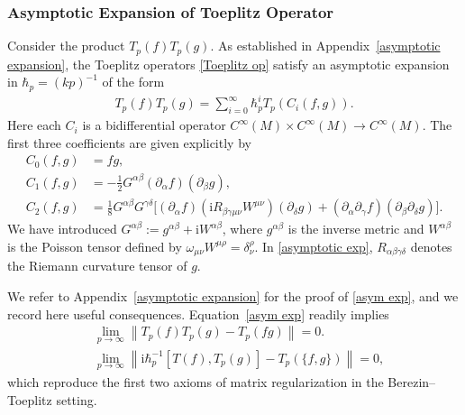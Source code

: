 \documentclass[12pt]{article}
\newcommand{\im}{\mathrm{i}}
\theoremstyle{definition} %
\theoremstyle{plain} %
\theoremstyle{remark} %
\theoremstyle{underline}
\begin{document}
\subsubsection{Asymptotic Expansion of Toeplitz Operator}

Consider the product \(T_p(f)T_p(g)\).
As established in Appendix~\ref{asymptotic expansion}, the Toeplitz operators \eqref{Toeplitz op} satisfy an asymptotic expansion in
\(\hbar_p=(kp)^{-1}\) of the form
\begin{align}
     T_p(f) T_p(g) = \sum_{i=0}^{\infty} \hbar_{p}^i T_p(C_i(f,g)).
    \label{asym exp}
\end{align}
Here each \(C_i\) is a bidifferential operator \(C^\infty(M)\times C^\infty(M)\to C^\infty(M)\).
The first three coefficients are given explicitly by
\begin{align}
    C_0(f,g) &= fg,\\
    C_1(f,g) &= -\frac{1}{2} G^{\alpha\beta}(\partial_{\alpha}f)(\partial_{\beta}g),\\
    C_2(f,g) &= \frac{1}{8} G^{\alpha\beta}G^{\gamma\delta}
    \bigl[(\partial_{\alpha} f)
    ( \im R_{\beta \gamma \mu \nu} W^{\mu\nu} )
    (\partial_{\delta}g)
    + (\partial_{\alpha} \partial_{\gamma} f)
    (\partial_{\beta} \partial_{\delta} g)\bigr].
    \label{asymptotic exp}
\end{align}
We have introduced
\(G^{\alpha\beta}:=g^{\alpha\beta}+\im W^{\alpha\beta}\), where \(g^{\alpha\beta}\)
is the inverse metric and \(W^{\alpha\beta}\) is the Poisson tensor defined by
\(\omega_{\mu\nu}W^{\mu\rho}=\delta_\nu^\rho\).
In \eqref{asymptotic exp}, \(R_{\alpha\beta\gamma\delta}\) denotes the Riemann curvature tensor of \(g\).

We refer to Appendix~\ref{asymptotic expansion} for the proof of
\eqref{asym exp}, and we record here useful consequences.
Equation~\eqref{asym exp} readily implies
\begin{align}
    \label{generalized matrix regularization}
    &\lim_{p\to\infty}\left\|T_p(f)T_p(g) - T_p(fg)\right\|=0.\\
    &\lim_{p\to\infty} \left\|\im \hbar_{p}^{-1}[T(f) , T_p(g)] -T_p(\{f,g\})\right\|=0,
\end{align}
which reproduce the first two axioms of matrix regularization in the Berezin--Toeplitz setting.
\end{document}
